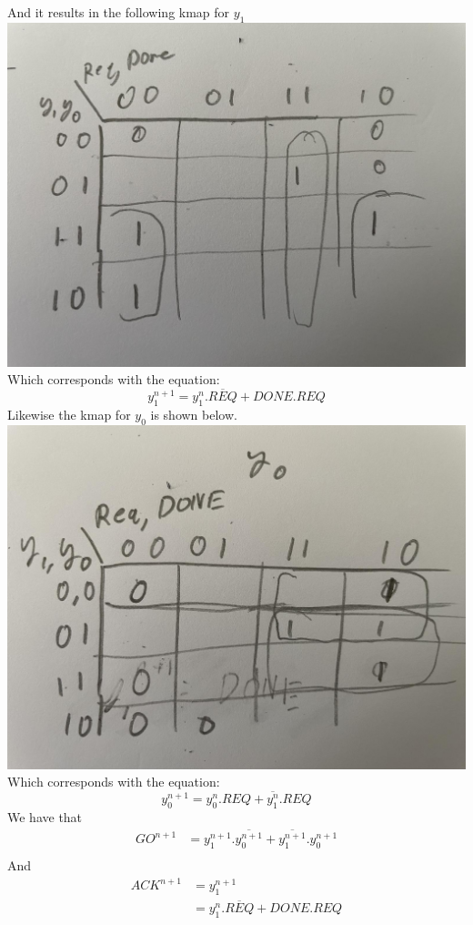\documentclass[12pt]{article}
\begin{document}
And it results in the following kmap for $y_1$\\
\includegraphics[scale=0.15]{fig20.jpg}\\
Which corresponds with the equation:
$$y_1^{n+1}=y_1^n.\overline{REQ}+DONE.REQ$$
Likewise the kmap for $y_0$ is shown below.\\
\includegraphics[scale=0.15]{fig21.jpg}\\
Which corresponds with the equation:
$$y_0^{n+1}=y_0^n.REQ+\overline{y_1^n}.REQ$$
We have that
\begin{align*}
    GO^{n+1}&=y_1^{n+1}.\overline{y_0^{n+1}}+\overline{y_1^{n+1}}.y_0^{n+1}\\
\end{align*}
And
\begin{align*}
    ACK^{n+1}&=y_1^{n+1}\\
    &=y_1^n.\overline{REQ}+DONE.REQ
\end{align*}
\end{document}
